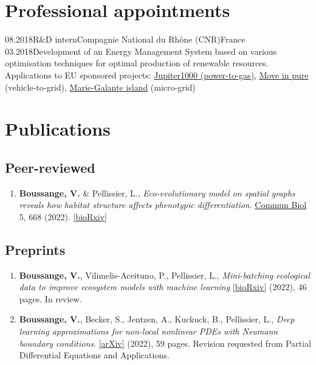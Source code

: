 \section*{Professional appointments}
\begin{experiences}
    \experienceshortbis
      {08.2018}{R\&D intern}{Compagnie National du Rh\^one (CNR)}{France}
      {03.2018}{Development of an Energy Management System based on various optimisation techniques for optimal production of renewable resources. Applications to EU sponsored projects: \hyperlink{https://www.jupiter1000.eu/english}{{\color{ctcoloraccessory}Jupiter1000} (power-to-gas)},
      \hyperlink{https://www.cnr.tm.fr/en/innovation/close-to-the-pulse-of-the-territories/}{\color{ctcoloraccessory} Move in pure} (vehicle-to-grid),
      \hyperlink{https://www.youtube.com/watch?v=962bBweyx1s}{{\color{ctcoloraccessory} Marie-Galante island}} (micro-grid)}{}
  \end{experiences}

\section*{Publications}
\subsection*{Peer-reviewed}
\begin{enumerate}[1.]
  \item \textbf{Boussange, V.} \& Pellissier, L., \textit{Eco-evolutionary model on spatial graphs reveals how habitat structure affects phenotypic differentiation}. \hyperlink{https://doi.org/10.1038/s42003-022-03595-3}{\color{ctcoloraccessory} Commun Biol} 5, 668 (2022). \hyperlink{https://www.biorxiv.org/content/10.1101/2021.07.06.451404.abstract}{[{\color{ctcoloraccessory}bioRxiv}]}
\end{enumerate}
\subsection*{Preprints}
\begin{enumerate}[1.]
  \item \textbf{Boussange, V.}, Vilimelis-Aceituno, P., Pellissier, L., \textit{Mini-batching ecological data to improve ecosystem models with machine learning} \hyperlink{https://www.biorxiv.org/content/10.1101/2022.07.25.501365v1}{[{\color{ctcoloraccessory}bioRxiv}]} (2022), 46 pages. In review.
  \item \textbf{Boussange, V.}, Becker, S., Jentzen, A., Kuckuck, B., Pellissier, L., \textit{Deep learning approximations for non-local nonlinear PDEs with Neumann boundary conditions}. \hyperlink{https://arxiv.org/abs/2205.03672}{[{\color{ctcoloraccessory}arXiv}]} (2022), 59 pages. Revision requested from Partial Differential Equations and Applications.
\end{enumerate}
